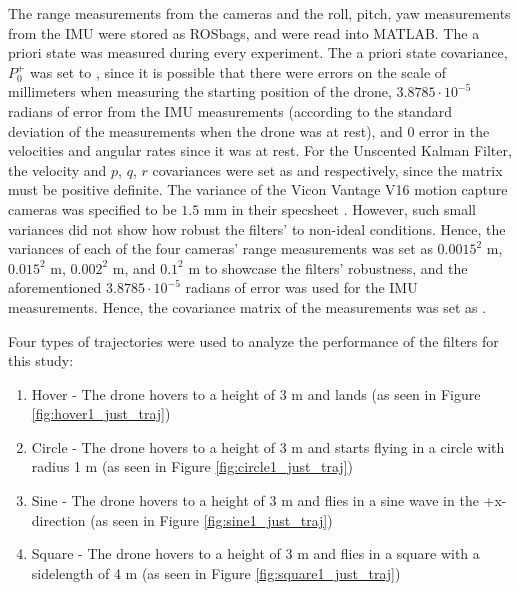 \documentclass[letterpaper, paper,11pt]{AAS}	%
\begin{document}
The range measurements from the cameras and the roll, pitch, yaw measurements from the IMU were stored as ROSbags, and were read into MATLAB. The a priori state was measured during every experiment. The a priori state covariance, $P_0^+$ was set to , since it is possible that there were errors on the scale of millimeters when measuring the starting position of the drone, $3.8785\cdot 10^{-5}$ radians of error from the IMU measurements (according to the standard deviation of the measurements when the drone was at rest), and 0 error in the velocities and angular rates since it was at rest. For the Unscented Kalman Filter, the velocity and $p$, $q$, $r$ covariances were set as  and  respectively, since the matrix must be positive definite. The variance of the Vicon Vantage V16 motion capture cameras was specified to be $1.5$ mm in their specsheet \cite{vicon_2022}. However, such small variances did not show how robust the filters' to non-ideal conditions. Hence, the variances of each of the four cameras' range measurements was set as $0.0015^2$ m, $0.015^2$ m, $0.002^2$ m, and $0.1^2$ m to showcase the filters' robustness, and the aforementioned $3.8785\cdot 10^{-5}$ radians of error was used for the IMU measurements. Hence, the covariance matrix of the measurements was set as .

Four types of trajectories were used to analyze the performance of the filters for this study:
\begin{enumerate}[label=(\alph*)]
\item Hover - The drone hovers to a height of 3 m and lands (as seen in Figure \ref{fig:hover1_just_traj})
\item Circle - The drone hovers to a height of 3 m and starts flying in a circle with radius 1 m (as seen in Figure \ref{fig:circle1_just_traj})
\item Sine - The drone hovers to a height of 3 m and flies in a sine wave in the +x-direction (as seen in Figure \ref{fig:sine1_just_traj})
\item Square - The drone hovers to a height of 3 m and flies in a square with a sidelength of 4 m (as seen in Figure \ref{fig:square1_just_traj})
\end{enumerate}
\end{document}
